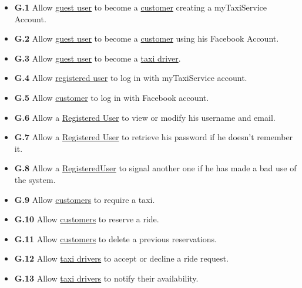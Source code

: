 		\begin{itemize}
			\item \textbf{\lbrack G.1\rbrack}\label{sec:g1} Allow \hyperref[sec:normaluser]{guest user} to become a \hyperref[sec:customer]{customer} creating a myTaxiService Account.

			\item \textbf{\lbrack G.2\rbrack}\label{sec:g2} Allow \hyperref[sec:normaluser]{guest user} to become a \hyperref[sec:customer]{customer} using his Facebook Account.

			\item \textbf{\lbrack G.3\rbrack}\label{sec:g3} Allow \hyperref[sec:normaluser]{guest user} to become a \hyperref[sec:tdriver]{taxi driver}.

			\item \textbf{\lbrack G.4\rbrack}\label{sec:g4} Allow \hyperref[sec:ruser]{registered user} to log in with myTaxiService account.

			\item \textbf{\lbrack G.5\rbrack}\label{sec:g5} Allow \hyperref[sec:customer]{customer} to log in with Facebook account.

			\item \textbf{\lbrack G.6\rbrack}\label{sec:g6} Allow a \hyperref[sec:normaluser]{Registered User} to view or modify his username and email.

			\item \textbf{\lbrack G.7\rbrack}\label{sec:g7} Allow a \hyperref[sec:normaluser]{Registered User} to retrieve his password if he doesn't remember it.

			\item \textbf{\lbrack G.8\rbrack}\label{sec:g8} Allow a \hyperref[sec:normaluser]{RegisteredUser} to signal another one if he has made a bad use of the system.

			\item \textbf{\lbrack G.9\rbrack}\label{sec:g9} Allow \hyperref[sec:customer]{customers} to require a taxi.

			\item \textbf{\lbrack G.10\rbrack}\label{sec:g10} Allow \hyperref[sec:customer]{customers} to reserve a ride.

			\item \textbf{\lbrack G.11\rbrack}\label{sec:g11} Allow \hyperref[sec:customer]{customers} to delete a previous reservations.

			\item \textbf{\lbrack G.12\rbrack}\label{sec:g12} Allow \hyperref[sec:tdriver]{taxi drivers} to accept or decline a ride request.

			\item \textbf{\lbrack G.13\rbrack}\label{sec:g13} Allow \hyperref[sec:tdriver]{taxi drivers} to notify their availability.
		\end{itemize}
		
